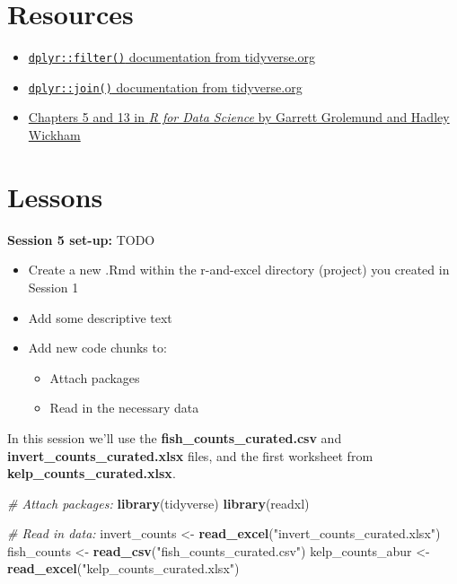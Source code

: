 \documentclass[]{book}
\newenvironment{Shaded}{\begin{snugshade}}{\end{snugshade}}
\newcommand{\CommentTok}[1]{\textcolor[rgb]{0.56,0.35,0.01}{\textit{#1}}}
\newcommand{\KeywordTok}[1]{\textcolor[rgb]{0.13,0.29,0.53}{\textbf{#1}}}
\newcommand{\NormalTok}[1]{#1}
\newcommand{\StringTok}[1]{\textcolor[rgb]{0.31,0.60,0.02}{#1}}
\providecommand{\tightlist}{%
  \setlength{\itemsep}{0pt}\setlength{\parskip}{0pt}}
\begin{document}
\hypertarget{resources-6}{%
\section{Resources}\label{resources-6}}

\begin{itemize}
\tightlist
\item
  \href{https://dplyr.tidyverse.org/reference/filter.html}{\texttt{dplyr::filter()} documentation from tidyverse.org}
\item
  \href{https://dplyr.tidyverse.org/reference/join.html}{\texttt{dplyr::join()} documentation from tidyverse.org}
\item
  \href{https://r4ds.had.co.nz/}{Chapters 5 and 13 in \emph{R for Data Science} by Garrett Grolemund and Hadley Wickham}
\end{itemize}

\hypertarget{lessons-2}{%
\section{Lessons}\label{lessons-2}}

\textbf{Session 5 set-up:} TODO

\begin{itemize}
\tightlist
\item
  Create a new .Rmd within the r-and-excel directory (project) you created in Session 1
\item
  Add some descriptive text
\item
  Add new code chunks to:

  \begin{itemize}
  \tightlist
  \item
    Attach packages
  \item
    Read in the necessary data
  \end{itemize}
\end{itemize}

In this session we'll use the \textbf{fish\_counts\_curated.csv} and \textbf{invert\_counts\_curated.xlsx} files, and the first worksheet from \textbf{kelp\_counts\_curated.xlsx}.

\begin{Shaded}
\begin{Highlighting}[]
\CommentTok{# Attach packages:}
\KeywordTok{library}\NormalTok{(tidyverse)}
\KeywordTok{library}\NormalTok{(readxl)}

\CommentTok{# Read in data: }
\NormalTok{invert_counts <-}\StringTok{ }\KeywordTok{read_excel}\NormalTok{(}\StringTok{"invert_counts_curated.xlsx"}\NormalTok{)}
\NormalTok{fish_counts <-}\StringTok{ }\KeywordTok{read_csv}\NormalTok{(}\StringTok{"fish_counts_curated.csv"}\NormalTok{)}
\NormalTok{kelp_counts_abur <-}\StringTok{ }\KeywordTok{read_excel}\NormalTok{(}\StringTok{"kelp_counts_curated.xlsx"}\NormalTok{)}
\end{Highlighting}
\end{Shaded}
\end{document}
